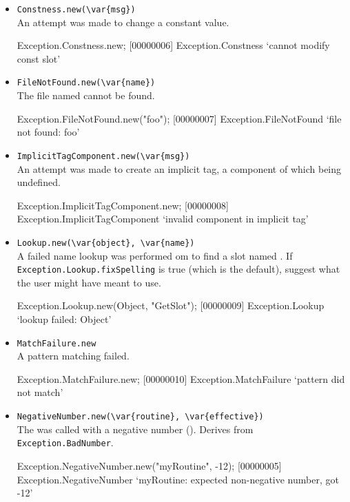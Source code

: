 \begin{itemize}
\item \lstinline|Constness.new(\var{msg})|\\
  An attempt was made to change a constant value.
\begin{urbiscript}
Exception.Constness.new;
[00000006] Exception.Constness `cannot modify const slot'
\end{urbiscript}

\item \lstinline|FileNotFound.new(\var{name})|\\
  The file named  cannot be found.
\begin{urbiscript}
Exception.FileNotFound.new("foo");
[00000007] Exception.FileNotFound `file not found: foo'
\end{urbiscript}

\item \lstinline|ImplicitTagComponent.new(\var{msg})|\\
  An attempt was made to create an implicit tag, a component of which
  being undefined.
\begin{urbiscript}
Exception.ImplicitTagComponent.new;
[00000008] Exception.ImplicitTagComponent `invalid component in implicit tag'
\end{urbiscript}

\item \lstinline|Lookup.new(\var{object}, \var{name})|\\
  A failed name lookup was performed om  to find a slot
  named .  If \lstinline|Exception.Lookup.fixSpelling| is
  true (which is the default), suggest what the user might have meant
  to use.
\begin{urbiscript}
Exception.Lookup.new(Object, "GetSlot");
[00000009] Exception.Lookup `lookup failed: Object'
\end{urbiscript}

\item \lstinline|MatchFailure.new|\\
  A pattern matching failed.
\begin{urbiscript}
Exception.MatchFailure.new;
[00000010] Exception.MatchFailure `pattern did not match'
\end{urbiscript}

\item \lstinline|NegativeNumber.new(\var{routine}, \var{effective})|\\
  The  was called with a negative number
  ().  Derives from \lstinline|Exception.BadNumber|.
\begin{urbiscript}
Exception.NegativeNumber.new("myRoutine", -12);
[00000005] Exception.NegativeNumber `myRoutine: expected non-negative number, got -12'
\end{urbiscript}


\end{itemize}
